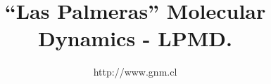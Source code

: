 \documentclass[a4paper,10pt]{scrbook}
\begin{document}
\author{http://www.gnm.cl}
\title{``Las Palmeras'' Molecular Dynamics - \textbf{LPMD}.}
\maketitle

\tableofcontents




\end{document}
